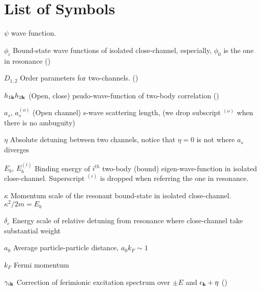 \documentclass[edeposit,fullpage]{uiucthesis2009}
\begin{document}
\tableofcontents
\listoffigures

%

\chapter{List of Symbols}

\begin{symbollist}[0.7in]
\item[$\psi$] wave function.
\item[$\phi_{i}$] Bound-state wave functions of  isolated close-channel, especially, $\phi_{0}$ is the one in resonance (\pageref{eq:pathInt2:phi})
\item[$D_{1,2}$] Order parameters for two-channels. (\pageref{eq:pathInt2:Ddef})
\item[$h_{1\mathbf{k}} h_{2\mathbf{k}}$] (Open, close) psudo-wave-function of two-body correlation (\pageref{eq:pathInt2:h2})
\item[$a_{s}$, $a_{s}^{(o)}$] (Open channel) s-wave scattering length, (we drop subscript ${}^{(o)}$ when there is no ambuguity) 
\item[$\eta$] Absolute detuning between two channels, notice that $\eta=0$ is not where $a_{s}$ diverges
\item[$E_{b}$, $E_{b}^{(i)}$] Binding energy of $i^{th}$ two-body (bound) eigen-wave-function in isolated close-channel.  Superscript ${}^{(i)}$ is dropped when referring the one in resonance. 
\item[$\kappa$] Momentum scale of the resonant bound-state in isolated close-channel.  $\kappa^{2}/2m=E_{b}$
\item[$\delta_{c}$] Energy scale of relative detuning from resonance where close-channel take substantial weight
\item[$a_{0}$] Average particle-particle distance, $a_{0}k_{F}\sim1$
\item[$k_{F}$] Fermi momentum
\item[$\gamma_{i\mathbf{k}}$] Correction of ferimionic excitation spectrum over $\pm{}E$ and $\epsilon_{\mathbf{k}}+\eta$ (\pageref{eq:pathInt2:xiExpand})
\end{symbollist}
\end{document}
